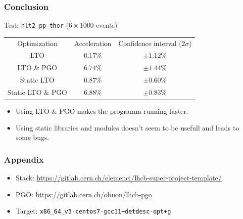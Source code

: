 \documentclass{beamer}
\begin{document}
    \begin{frame}[fragile]
        \frametitle{Conclusion}

        Test: \verb'hlt2_pp_thor' ($6 \times 1000$ events)
        \begin{center}
            \begin{tabular}{ c c c }
                Optimization & Acceleration & Confidence interval ($2\sigma$) \\
                LTO & $0.17\%$ & $\pm 1.12\%$ \\
                LTO \& PGO & $6.74\%$ & $\pm 1.44\%$ \\
                Static LTO & $0.87\%$ & $\pm 0.60\%$ \\
                Static LTO \& PGO & $6.88\%$ & $\pm 0.83\%$
            \end{tabular}
        \end{center}

        \begin{itemize}
            \item Using LTO \& PGO makes the programm running faster.
            \item Using static libraries and modules doesn't seem to be usefull and leads to some bugs.
        \end{itemize}
    \end{frame}

    \appendix

    \begin{frame}[fragile]
        \frametitle{Appendix}

        \begin{itemize}
            \item Stack: \scriptsize \url{https://gitlab.cern.ch/clemenci/lhcb-super-project-template/} \normalsize
            \item PGO: \scriptsize \url{https://gitlab.cern.ch/obuon/lhcb-pgo} \normalsize
            \item Target: \verb'x86_64_v3-centos7-gcc11+detdesc-opt+g'
        \end{itemize}
    \end{frame}
\end{document}
